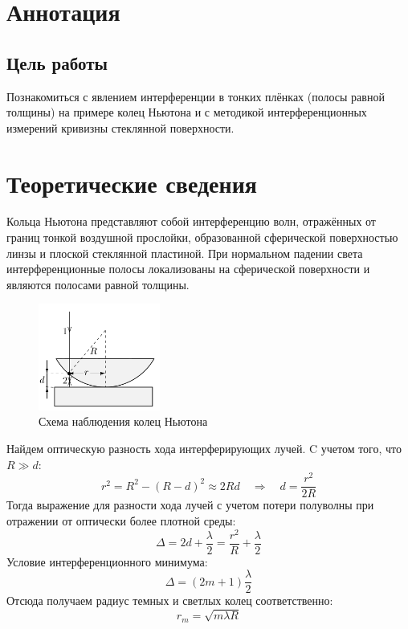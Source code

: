 \section*{Аннотация}

\subsection*{Цель работы}
Познакомиться с явлением интерференции в тонких
плёнках (полосы равной толщины) на примере колец Ньютона и с
методикой интерференционных измерений кривизны стеклянной поверхности.
\section*{Теоретические сведения}
\indent Кольца Ньютона представляют собой интерференцию волн, отражённых от границ тонкой 
воздушной прослойки, образованной сферической поверхностью линзы и плоской
стеклянной пластиной. При нормальном падении света интерференционные полосы 
локализованы на сферической поверхности и являются полосами равной толщины.

\begin{figure}
    \centering
    \includegraphics[width=4cm]{images/theory.png}
    \caption{Схема наблюдения колец Ньютона}
\end{figure}

\indent
Найдем оптическую разность хода интерферирующих лучей. C учетом того, что $R \gg d$:
$$r^2 = R^2 - (R - d)^2 \approx 2Rd \quad \Rightarrow \quad d = \frac{r^2}{2R}$$ 
Тогда выражение для разности хода лучей с учетом потери полуволны при отражении от оптически более плотной среды:
\begin{equation}
    \Delta = 2d + \frac{\lambda}{2} = \frac{r^2}{R} + \frac{\lambda}{2}
\end{equation}
Условие интерференционного минимума:
\begin{equation}
    \Delta = (2m + 1)\frac{\lambda}{2}
\end{equation}
Отсюда получаем радиус темных и светлых колец соответственно:
\begin{equation}
    r_m = \sqrt{m\lambda R}
\end{equation}

